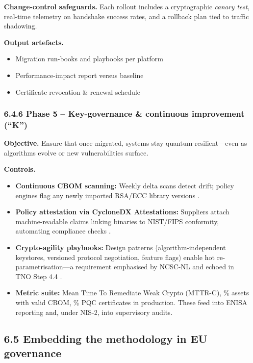 \documentclass[
  english,
]{article}
\providecommand{\tightlist}{%
  \setlength{\itemsep}{0pt}\setlength{\parskip}{0pt}}
\begin{document}
\textbf{Change-control safeguards.} Each rollout includes a
cryptographic \emph{canary test}, real-time telemetry on handshake
success rates, and a rollback plan tied to traffic shadowing.

\textbf{Output artefacts.}

\begin{itemize}
\tightlist
\item
  Migration run-books and playbooks per platform
\item
  Performance-impact report versus baseline
\item
  Certificate revocation \& renewal schedule
\end{itemize}

\subsubsection{6.4.6 Phase 5 -- Key-governance \& continuous improvement
(``K'')}\label{phase-5-key-governance-continuous-improvement-k}

\textbf{Objective.} Ensure that once migrated, systems stay
quantum-resilient---even as algorithms evolve or new vulnerabilities
surface.

\textbf{Controls.}

\begin{itemize}
\tightlist
\item
  \textbf{Continuous CBOM scanning:} Weekly delta scans detect drift;
  policy engines flag any newly imported RSA/ECC library versions .
\item
  \textbf{Policy attestation via CycloneDX Attestations:} Suppliers
  attach machine-readable claims linking binaries to NIST/FIPS
  conformity, automating compliance checks .
\item
  \textbf{Crypto-agility playbooks:} Design patterns
  (algorithm-independent keystores, versioned protocol negotiation,
  feature flags) enable hot re-parametrisation---a requirement
  emphasised by NCSC-NL and echoed in TNO Step 4.4 .
\item
  \textbf{Metric suite:} Mean Time To Remediate Weak Crypto (MTTR-C), \%
  assets with valid CBOM, \% PQC certificates in production. These feed
  into ENISA reporting and, under NIS-2, into supervisory audits.
\end{itemize}

\subsection{6.5 Embedding the methodology in EU
governance}\label{embedding-the-methodology-in-eu-governance}
\end{document}
